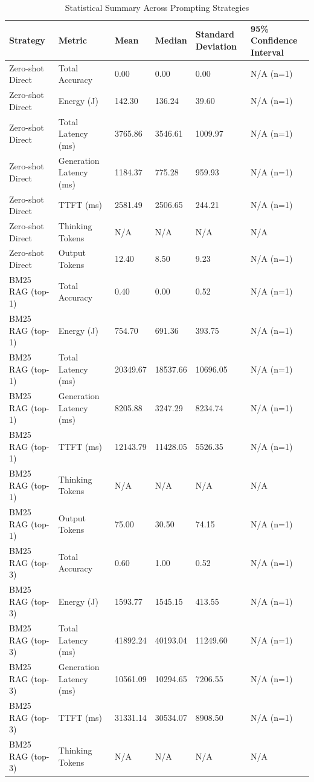 \begin{table}
\caption{Statistical Summary Across Prompting Strategies}
\label{tab:statistical_summary}
\begin{tabular}{llllll}
\toprule
Strategy & Metric & Mean & Median & Standard Deviation & 95\% Confidence Interval \\
\midrule
Zero-shot Direct & Total Accuracy & 0.00 & 0.00 & 0.00 & N/A (n=1) \\
Zero-shot Direct & Energy (J) & 142.30 & 136.24 & 39.60 & N/A (n=1) \\
Zero-shot Direct & Total Latency (ms) & 3765.86 & 3546.61 & 1009.97 & N/A (n=1) \\
Zero-shot Direct & Generation Latency (ms) & 1184.37 & 775.28 & 959.93 & N/A (n=1) \\
Zero-shot Direct & TTFT (ms) & 2581.49 & 2506.65 & 244.21 & N/A (n=1) \\
Zero-shot Direct & Thinking Tokens & N/A & N/A & N/A & N/A \\
Zero-shot Direct & Output Tokens & 12.40 & 8.50 & 9.23 & N/A (n=1) \\
BM25 RAG (top-1) & Total Accuracy & 0.40 & 0.00 & 0.52 & N/A (n=1) \\
BM25 RAG (top-1) & Energy (J) & 754.70 & 691.36 & 393.75 & N/A (n=1) \\
BM25 RAG (top-1) & Total Latency (ms) & 20349.67 & 18537.66 & 10696.05 & N/A (n=1) \\
BM25 RAG (top-1) & Generation Latency (ms) & 8205.88 & 3247.29 & 8234.74 & N/A (n=1) \\
BM25 RAG (top-1) & TTFT (ms) & 12143.79 & 11428.05 & 5526.35 & N/A (n=1) \\
BM25 RAG (top-1) & Thinking Tokens & N/A & N/A & N/A & N/A \\
BM25 RAG (top-1) & Output Tokens & 75.00 & 30.50 & 74.15 & N/A (n=1) \\
BM25 RAG (top-3) & Total Accuracy & 0.60 & 1.00 & 0.52 & N/A (n=1) \\
BM25 RAG (top-3) & Energy (J) & 1593.77 & 1545.15 & 413.55 & N/A (n=1) \\
BM25 RAG (top-3) & Total Latency (ms) & 41892.24 & 40193.04 & 11249.60 & N/A (n=1) \\
BM25 RAG (top-3) & Generation Latency (ms) & 10561.09 & 10294.65 & 7206.55 & N/A (n=1) \\
BM25 RAG (top-3) & TTFT (ms) & 31331.14 & 30534.07 & 8908.50 & N/A (n=1) \\
BM25 RAG (top-3) & Thinking Tokens & N/A & N/A & N/A & N/A \\

\end{tabular}
\end{table}
